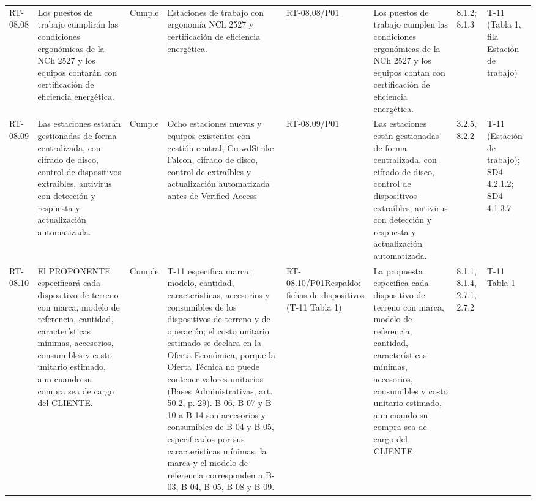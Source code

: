 \documentclass[oficio,firma,final]{lafrox}
\begin{document}
\begin{landscape}
{\begin{longtable}{@{}F{0.054} F{0.173} F{0.061} F{0.191} F{0.106} F{0.180} F{0.067} F{0.168}@{}}
  RT-08.08 & Los puestos de trabajo cumplirán las condiciones ergonómicas de la NCh 2527 y los equipos contarán con certificación de eficiencia energética. & Cumple & Estaciones de trabajo con ergonomía NCh 2527 y certificación de eficiencia energética. & RT-08.08/\allowbreak{}P01 & Los puestos de trabajo cumplen las condiciones ergonómicas de la NCh 2527 y los equipos contan con certificación de eficiencia energética. & 8.1.2; 8.1.3 & T-11 (Tabla 1, fila Estación de trabajo)  \\
  RT-08.09 & Las estaciones estarán gestionadas de forma centralizada, con cifrado de disco, control de dispositivos extraíbles, antivirus con detección y respuesta y actualización automatizada. & Cumple & Ocho estaciones nuevas y equipos existentes con gestión central, CrowdStrike Falcon, cifrado de disco, control de extraíbles y actualización automatizada antes de Verified Access & RT-08.09/\allowbreak{}P01 & Las estaciones están gestionadas de forma centralizada, con cifrado de disco, control de dispositivos extraíbles, antivirus con detección y respuesta y actualización automatizada. & 3.2.5, 8.2.2 & T-11 (Estación de trabajo); SD4 4.2.1.2; SD4 4.1.3.7  \\
  RT-08.10 & El PROPONENTE especificará cada dispositivo de terreno con marca, modelo de referencia, cantidad, características mínimas, accesorios, consumibles y costo unitario estimado, aun cuando su compra sea de cargo del CLIENTE. & Cumple & T-11 especifica marca, modelo, cantidad, características, accesorios y consumibles de los dispositivos de terreno y de operación; el costo unitario estimado se declara en la Oferta Económica, porque la Oferta Técnica no puede contener valores unitarios (Bases Administrativas, art. 50.2, p. 29). B-06, B-07 y B-10 a B-14 son accesorios y consumibles de B-04 y B-05, especificados por sus características mínimas; la marca y el modelo de referencia corresponden a B-03, B-04, B-05, B-08 y B-09. & RT-08.10/\allowbreak{}P01\newline Respaldo: fichas de dispositivos (T-11 Tabla 1) & La propuesta especifica cada dispositivo de terreno con marca, modelo de referencia, cantidad, características mínimas, accesorios, consumibles y costo unitario estimado, aun cuando su compra sea de cargo del CLIENTE. & 8.1.1, 8.1.4, 2.7.1, 2.7.2 & T-11 Tabla 1  \\

\end{longtable}}
\end{landscape}
\end{document}

